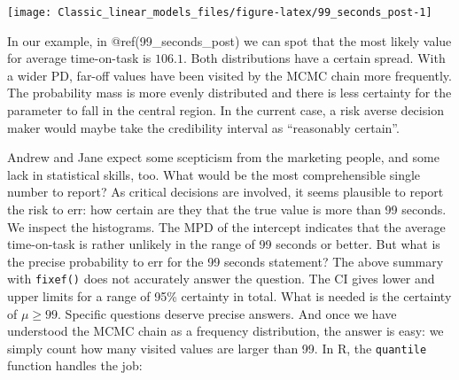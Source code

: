 \documentclass[]{svmono}
\newenvironment{Shaded}{\begin{snugshade}}{\end{snugshade}}
\newcommand{\KeywordTok}[1]{\textcolor[rgb]{0.13,0.29,0.53}{\textbf{#1}}}
\newcommand{\DataTypeTok}[1]{\textcolor[rgb]{0.13,0.29,0.53}{#1}}
\newcommand{\DecValTok}[1]{\textcolor[rgb]{0.00,0.00,0.81}{#1}}
\newcommand{\StringTok}[1]{\textcolor[rgb]{0.31,0.60,0.02}{#1}}
\newcommand{\OtherTok}[1]{\textcolor[rgb]{0.56,0.35,0.01}{#1}}
\newcommand{\OperatorTok}[1]{\textcolor[rgb]{0.81,0.36,0.00}{\textbf{#1}}}
\newcommand{\NormalTok}[1]{#1}
\begin{document}
\begin{Shaded}
\end{Shaded}

\texttt{[image: Classic\_linear\_models\_files/figure-latex/99\_seconds\_post-1]}

In our example, in @ref(99\_seconds\_post) we can spot that the most
likely value for average time-on-task is \(106.1\). Both distributions
have a certain spread. With a wider PD, far-off values have been visited
by the MCMC chain more frequently. The probability mass is more evenly
distributed and there is less certainty for the parameter to fall in the
central region. In the current case, a risk averse decision maker would
maybe take the credibility interval as ``reasonably certain''.

Andrew and Jane expect some scepticism from the marketing people, and
some lack in statistical skills, too. What would be the most
comprehensible single number to report? As critical decisions are
involved, it seems plausible to report the risk to err: how certain are
they that the true value is more than 99 seconds. We inspect the
histograms. The MPD of the intercept indicates that the average
time-on-task is rather unlikely in the range of 99 seconds or better.
But what is the precise probability to err for the 99 seconds statement?
The above summary with \texttt{fixef()} does not accurately answer the
question. The CI gives lower and upper limits for a range of 95\%
certainty in total. What is needed is the certainty of \(\mu \geq 99\).
Specific questions deserve precise answers. And once we have understood
the MCMC chain as a frequency distribution, the answer is easy: we
simply count how many visited values are larger than 99. In R, the
\texttt{quantile} function handles the job:

\begin{Shaded}
\end{Shaded}
\end{document}
